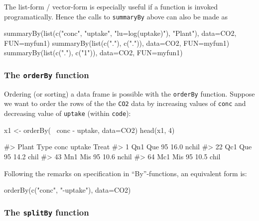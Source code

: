 The list-form / vector-form is especially useful if a function is
invoked programatically. Hence the calls to \texttt{summaryBy} above can
also be made as

\begin{Schunk}
\begin{Sinput}
summaryBy(list(c("conc", "uptake", "lu=log(uptake)"), "Plant"), data=CO2, FUN=myfun1)
summaryBy(list(c("."), c(".")), data=CO2, FUN=myfun1)
summaryBy(list(c("."), c("1")), data=CO2, FUN=myfun1)
\end{Sinput}
\end{Schunk}

\hypertarget{the-orderby-function}{%
\subsubsection{\texorpdfstring{The \texttt{orderBy}
function}{The orderBy function}}\label{the-orderby-function}}

Ordering (or sorting) a data frame is possible with the \texttt{orderBy}
function. Suppose we want to order the rows of the the \texttt{CO2} data
by increasing values of \texttt{conc} and decreasing value of
\texttt{uptake} (within \texttt{code}):

\begin{Schunk}
\begin{Sinput}
x1 <- orderBy(~ conc - uptake, data=CO2)
head(x1, 4)
\end{Sinput}
\begin{Soutput}
#>    Plant Type conc uptake Treat
#> 1    Qn1  Que   95   16.0 nchil
#> 22   Qc1  Que   95   14.2  chil
#> 43   Mn1  Mis   95   10.6 nchil
#> 64   Mc1  Mis   95   10.5  chil
\end{Soutput}
\end{Schunk}

Following the remarks on specification in ``By''-functions, an
equivalent form is:

\begin{Schunk}
\begin{Sinput}
orderBy(c("conc", "-uptake"), data=CO2) 
\end{Sinput}
\end{Schunk}

\hypertarget{the-splitby-function}{%
\subsubsection{\texorpdfstring{The \texttt{splitBy}
function}{The splitBy function}}\label{the-splitby-function}}

